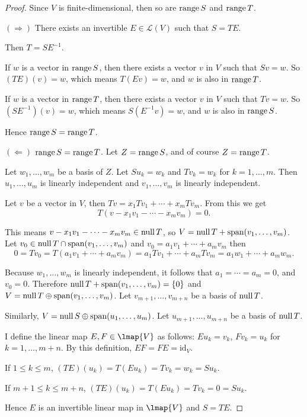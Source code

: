 \begin{proof}
    Since $V$ is finite-dimensional, then so are $\text{range}\,{S}$ and $\text{range}\,{T}$.

    $(\Rightarrow)$ There exists an invertible $E \in \mathcal{L}(V)$ such that $S = TE$.

    Then $T = SE^{-1}$.

    If $w$ is a vector in $\text{range}\,{S}$, then there exists a vector $v$ in $V$ such that $Sv = w$. So $(TE)(v) = w$, which means $T(Ev) = w$, and $w$ is also in $\text{range}\,{T}$.

    If $w$ is a vector in $\text{range}\,{T}$, then there exists a vector $v$ in $V$ such that $Tv = w$. So $(SE^{-1})(v) = w$, which means $S(E^{-1}v) = w$, and $w$ is also in $\text{range}\,{S}$.

    Hence $\text{range}\,{S} = \text{range}\,{T}$.

    $(\Leftarrow)$ $\text{range}\,{S} = \text{range}\,{T}$. Let $Z = \text{range}\,{S}$, and of course $Z = \text{range}\,{T}$.

    Let $w_{1}, \ldots, w_{m}$ be a basis of $Z$. Let $Su_{k} = w_{k}$ and $Tv_{k} = w_{k}$ for $k = 1, \ldots, m$. Then $u_{1}, \ldots, u_{m}$ is linearly independent and $v_{1}, \ldots, v_{m}$ is linearly independent.

    Let $v$ be a vector in $V$, then $Tv = x_{1}Tv_{1} + \cdots + x_{m}Tv_{m}$. From this we get
    \[
        T(v - x_{1}v_{1} - \cdots - x_{m}v_{m}) = 0.
    \]

    This means $v - x_{1}v_{1} - \cdots - x_{m}v_{m}\in \text{null}\,{T}$, so $V = \text{null}\,{T} + \text{span}(v_{1}, \ldots, v_{m})$. Let $v_{0}\in \text{null}\,{T} \cap \text{span}(v_{1}, \ldots, v_{m})$ and $v_{0} = a_{1}v_{1} + \cdots + a_{m}v_{m}$ then
    \[
        0 = Tv_{0} = T(a_{1}v_{1} + \cdots + a_{m}v_{m}) = a_{1}Tv_{1} + \cdots + a_{m}Tv_{m} = a_{1}w_{1} + \cdots + a_{m}w_{m}.
    \]

    Because $w_{1}, \ldots, w_{m}$ is linearly independent, it follows that $a_{1} = \cdots = a_{m} = 0$, and $v_{0} = 0$. Therefore $\text{null}\,{T} + \text{span}(v_{1}, \ldots, v_{m}) = \{0\}$ and $V = \text{null}\,{T} \oplus \text{span}(v_{1}, \ldots, v_{m})$. Let $v_{m+1}, \ldots, v_{m+n}$ be a basis of $\text{null}\,{T}$.

    Similarly, $V = \text{null}\,{S} \oplus\text{span}(u_{1}, \ldots, u_{m})$. Let $u_{m+1}, \ldots, u_{m+n}$ be a basis of $\text{null}\,{T}$.

    I define the linear map $E,F\in\lmap{V}$ as follows: $Eu_{k} = v_{k}$, $Fv_{k} = u_{k}$ for $k = 1,\ldots, m+n$. By this definition, $EF = FE = \text{id}_{V}$.

    If $1\leq k\leq m$, $(TE)(u_{k}) = T(Eu_{k}) = Tv_{k} = w_{k} = Su_{k}$.

    If $m+1\leq k\leq m+n$, $(TE)(u_{k}) = T(Eu_{k}) = Tv_{k} = 0 = Su_{k}$.

    Hence $E$ is an invertible linear map in $\lmap{V}$ and $S = TE$.
\end{proof}
\newpage

